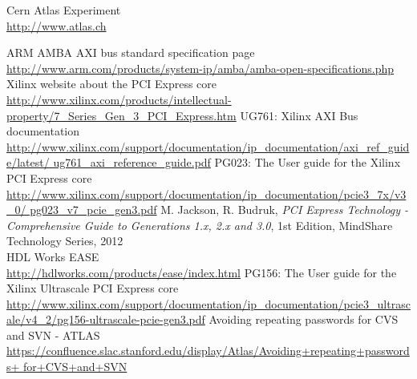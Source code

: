 \begin{thebibliography}{9}
  Cern Atlas Experiment\\
  \href{http://www.atlas.ch}{http://www.atlas.ch}

  ARM AMBA AXI bus standard specification page\\
  \href{http://www.arm.com/products/system-ip/amba/amba-open-specifications.php}{http://www.arm.com/products/system-ip/amba/amba-open-specifications.php}
  Xilinx website about the PCI Express core\\
  \href{http://www.xilinx.com/products/intellectual-property/7_Series_Gen_3_PCI_Express.htm}{http://www.xilinx.com/products/intellectual-property/7\_Series\_Gen\_3\_PCI\_Express.htm}
  UG761: Xilinx AXI Bus documentation\\
  \href{http://www.xilinx.com/support/documentation/ip_documentation/axi_ref_guide/latest/ug761_axi_reference_guide.pdf}{http://www.xilinx.com/support/documentation/ip\_documentation/axi\_ref\_guide/latest/ ug761\_axi\_reference\_guide.pdf}
  PG023: The User guide for the Xilinx PCI Express core\\
  \href{http://www.xilinx.com/support/documentation/ip_documentation/pcie3_7x/v3_0/pg023_v7_pcie_gen3.pdf}{http://www.xilinx.com/support/documentation/ip\_documentation/pcie3\_7x/v3\_0/ pg023\_v7\_pcie\_gen3.pdf}
  M. Jackson, R. Budruk, \textit{PCI Express Technology - Comprehensive Guide to Generations 1.x, 2.x and 3.0}, 1st Edition, MindShare Technology Series, 2012\\
  HDL Works EASE\\
  \href{http://hdlworks.com/products/ease/index.html}{http://hdlworks.com/products/ease/index.html}
  PG156: The User guide for the Xilinx Ultrascale PCI Express core \\
  \href{http://www.xilinx.com/support/documentation/ip_documentation/pcie3_ultrascale/v4_2/pg156-ultrascale-pcie-gen3.pdf}{http://www.xilinx.com/support/documentation/ip\_documentation/pcie3\_ultrascale/v4\_2/pg156-ultrascale-pcie-gen3.pdf}
  Avoiding repeating passwords for CVS and SVN - ATLAS\\
  \href{https://confluence.slac.stanford.edu/display/Atlas/Avoiding+repeating+passwords+for+CVS+and+SVN}{https://confluence.slac.stanford.edu/display/Atlas/Avoiding+repeating+passwords+ for+CVS+and+SVN}

\end{thebibliography}
